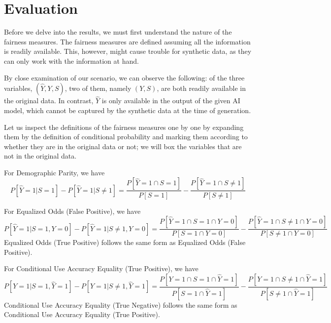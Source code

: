 \documentclass[manuscript,screen,review,anonymous]{acmart}
\begin{document}
\section{Evaluation}

Before we delve into the results, we must first understand the nature of the fairness measures. The fairness measures are defined assuming all the information is readily available. This, however, might cause trouble for synthetic data, as they can only work with the information at hand.

By close examination of our scenario, we can observe the following: of the three variables, $(\hat{Y},Y,S)$, two of them, namely $(Y,S)$, are both readily available in the original data. In contrast, $\hat{Y}$ is only available in the output of the given AI model, which cannot be captured by the synthetic data at the time of generation.

Let us inspect the definitions of the fairness measures one by one by expanding them by the definition of conditional probability and marking them according to whether they are in the original data or not; we will box the variables that are not in the original data.

\newcommand{\mathhighlight}[2]{\colorbox{#1}{$\displaystyle #2$}}
\newcommand{\y}[1]{{#1}}
\newcommand{\n}[1]{\boxed{#1}}

For Demographic Parity, we have
\[
P[\hat{Y} = 1 | S = 1] - P[\hat{Y} = 1 | S \neq 1]
= \frac{P[\n{\hat{Y}} = 1 \cap \y{S} = 1]}{P[\y{S} = 1]} - \frac{P[\n{\hat{Y}} = 1 \cap \y{S} \neq 1]}{P[\y{S} \neq 1]}
\]

For Equalized Odds (False Positive), we have
\[
P[\hat{Y} = 1 | S = 1, Y = 0] - P[\hat{Y} = 1 | S \neq 1, Y = 0]
= \frac{P[\n{\hat{Y}} = 1 \cap \y{S} = 1 \cap \y{Y} = 0]}{P[\y{S} = 1 \cap \y{Y} = 0]} - \frac{P[\n{\hat{Y}} = 1 \cap \y{S} \neq 1 \cap \y{Y} = 0]}{P[\y{S} \neq 1 \cap \y{Y} = 0]}
\]
Equalized Odds (True Positive) follows the same form as Equalized Odds (False Positive).

For Conditional Use Accuracy Equality (True Positive), we have
\[
P[Y = 1 | S = 1, \hat{Y} = 1] - P[Y = 1 | S \neq 1, \hat{Y} = 1]
= \frac{P[\y{Y} = 1 \cap \y{S} = 1 \cap \n{\hat{Y}} = 1]}{P[\y{S} = 1 \cap \n{\hat{Y}} = 1]} - \frac{P[\y{Y} = 1 \cap \y{{S}} \neq 1 \cap \n{\hat{Y}} = 1]}{P[\y{{S}} \neq 1 \cap \n{\hat{Y}} = 1]}
\]
Conditional Use Accuracy Equality (True Negative) follows the same form as Conditional Use Accuracy Equality (True Positive).
\end{document}
